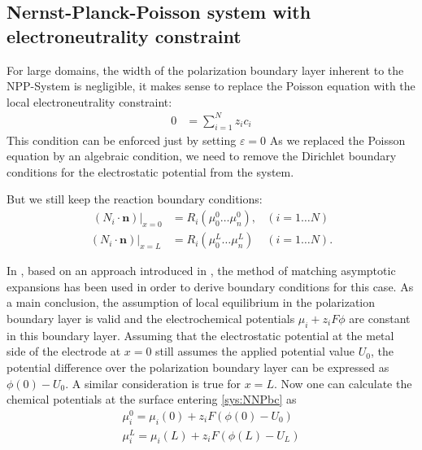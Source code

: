 \documentclass[12pt,oneside,reqno]{amsart}
\numberwithin{equation}{section}
\begin{document}
\subsection{Nernst-Planck-Poisson   system    with   electroneutrality constraint} 
For  large  domains, the  width  of  the polarization  boundary  layer
inherent to  the NPP-System is  negligible, it makes sense  to replace
the Poisson equation with the local electroneutrality constraint:
\begin{align}
  0&= \sum_{i=1}^N z_i c_i \label{eq:eneu}
\end{align}
This condition can be enforced just by setting  $\varepsilon=0$
As we replaced the Poisson equation by an algebraic condition, we need to remove 
the Dirichlet boundary conditions for the electrostatic potential from the system.

But we still keep the reaction boundary conditions:
\begin{subequations}\label{sys:NNPbc}
\begin{align}\
  (N_i\cdot \mathbf n)|_{x=0}&=R_i(\mu_0^0\dots\mu_n^0), & (i=1\dots N)\\
  (N_i\cdot \mathbf n)|_{x=L} &=R_i(\mu_0^L\dots\mu_n^L) & (i=1\dots N).
\end{align}
\end{subequations}

In \cite{guhlke2015theorie}, based on an approach introduced in \cite{caginalp1988dynamics}, the method
of matching asymptotic expansions has been used in order to derive boundary conditions for
this case. As a main conclusion, the assumption of local equilibrium 
in the polarization boundary layer is valid and 
the electrochemical potentials $\mu_i + z_i F \phi$ are constant in this boundary layer. Assuming that the electrostatic
potential at the metal side of the electrode at $x=0$ still assumes the applied potential value $U_0$, the
potential difference over the polarization boundary layer can be expressed as $\phi(0)-U_0$. A
similar consideration is true for $x=L$.
Now one can 
calculate the chemical potentials at the surface entering \eqref{sys:NNPbc} as
\begin{subequations}\label{sys:neubc}
   \begin{align}
     \mu_i^0=\mu_i(0) + z_i F(\phi(0)-U_0)\\
     \mu_i^L=\mu_i(L) + z_i F(\phi(L)-U_L)
   \end{align}
 \end{subequations}
\end{document}
